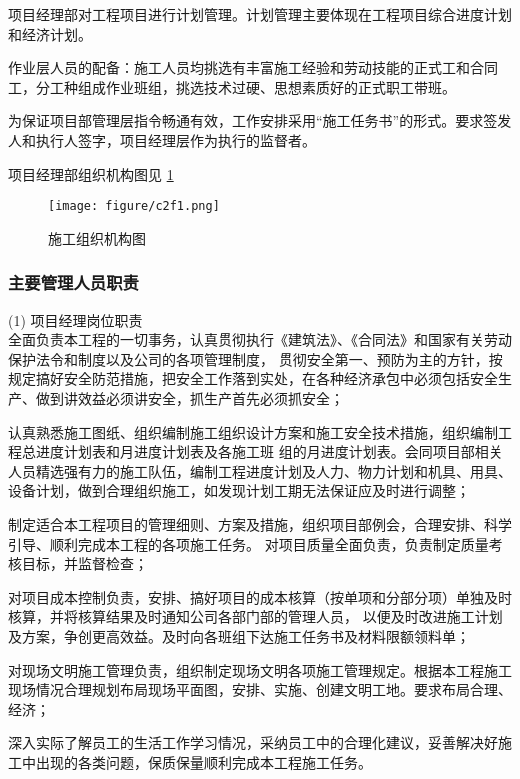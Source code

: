 项目经理部对工程项目进行计划管理。计划管理主要体现在工程项目综合进度计划和经济计划。

作业层人员的配备：施工人员均挑选有丰富施工经验和劳动技能的正式工和合同工，分工种组成作业班组，挑选技术过硬、思想素质好的正式职工带班。

为保证项目部管理层指令畅通有效，工作安排采用“施工任务书”的形式。要求签发人和执行人签字，项目经理层作为执行的监督者。

项目经理部组织机构图见 \ref{fig:c2f1}

\begin{figure}[thbp!]
    \centering
    \texttt{[image: figure/c2f1.png]}
    \caption{施工组织机构图}
    \label{fig:c2f1}
\end{figure}

\subsubsection{主要管理人员职责}

(1) 项目经理岗位职责\\

 全面负责本工程的一切事务，认真贯彻执行《建筑法》、《合同法》和国家有关劳动保护法令和制度以及公司的各项管理制度，
贯彻安全第一、预防为主的方针，按规定搞好安全防范措施，把安全工作落到实处，在各种经济承包中必须包括安全生产、做到讲效益必须讲安全，抓生产首先必须抓安全；

 认真熟悉施工图纸、组织编制施工组织设计方案和施工安全技术措施，组织编制工程总进度计划表和月进度计划表及各施工班
组的月进度计划表。会同项目部相关人员精选强有力的施工队伍，编制工程进度计划及人力、物力计划和机具、用具、设备计划，做到合理组织施工，如发现计划工期无法保证应及时进行调整；

 制定适合本工程项目的管理细则、方案及措施，组织项目部例会，合理安排、科学引导、顺利完成本工程的各项施工任务。
对项目质量全面负责，负责制定质量考核目标，并监督检查；

 对项目成本控制负责，安排、搞好项目的成本核算（按单项和分部分项）单独及时核算，并将核算结果及时通知公司各部门部的管理人员，
以便及时改进施工计划及方案，争创更高效益。及时向各班组下达施工任务书及材料限额领料单；

 对现场文明施工管理负责，组织制定现场文明各项施工管理规定。根据本工程施工现场情况合理规划布局现场平面图，安排、实施、创建文明工地。要求布局合理、经济；

 深入实际了解员工的生活工作学习情况，采纳员工中的合理化建议，妥善解决好施工中出现的各类问题，保质保量顺利完成本工程施工任务。\\

